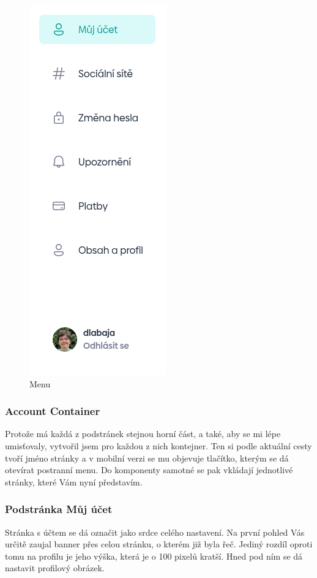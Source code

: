 \begin{figure}
    \centering
    \includegraphics[width=0.5\linewidth]{obrazky/menu.png}
    \caption{Menu}
\end{figure}


\subsubsection{Account Container}
Protože má každá z podstránek stejnou horní část, a také, aby se mi lépe umisťovaly, vytvořil jsem pro každou z nich kontejner. Ten si podle aktuální cesty tvoří jméno stránky a v mobilní verzi se mu objevuje tlačítko, kterým se dá otevírat postranní menu. Do komponenty samotné se pak vkládají jednotlivé stránky, které Vám nyní představím.


\subsubsection{Podstránka Můj účet}
Stránka s účtem se dá označit jako srdce celého nastavení. Na první pohled Vás určitě zaujal banner přes celou stránku, o kterém již byla řeč. Jediný rozdíl oproti tomu na profilu je jeho výška, která je o 100 pixelů kratší. Hned pod ním se dá nastavit profilový obrázek.

